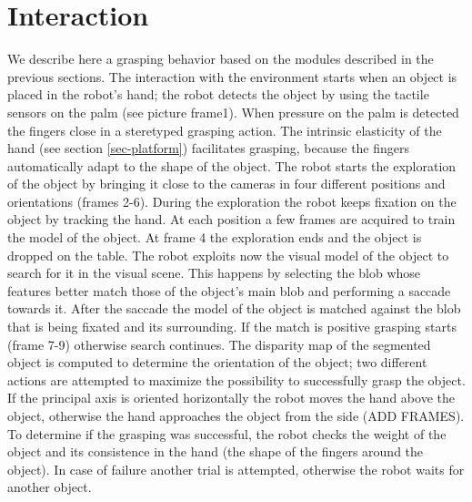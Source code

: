 \section{Interaction}
We describe here a grasping behavior based on the modules described in the previous sections. The interaction with the environment starts when an object is placed in the robot's hand; the robot detects the object by using the tactile sensors on the palm (see picture frame1). When pressure on the palm is detected the fingers close in a steretyped grasping action. The intrinsic elasticity of the hand (see section \ref{sec-platform}) facilitates grasping, because the fingers automatically adapt to the shape of the object. The robot starts the exploration of the object by bringing it close to the cameras in four different positions and orientations (frames 2-6). During the exploration the robot keeps fixation on the object by tracking the hand. At each position a few frames are acquired to train the model of the object. At frame 4 the exploration ends and the object is dropped on the table. The robot exploits now the visual model of the object to search for it in the visual scene. This happens by selecting the blob whose features better match those of the object's main blob and performing a saccade towards it. After the saccade the model of the object is matched against the blob that is being fixated and its surrounding. If the match is positive grasping starts (frame 7-9) otherwise search continues. The disparity map of the segmented object is computed to determine the orientation of the object; two different actions are attempted to maximize the possibility to successfully grasp the object. If the principal axis is oriented horizontally the robot moves the hand above the object, otherwise the hand approaches the object from the side (ADD FRAMES). To determine if the grasping was successful, the robot checks the weight of the object and its consistence in the hand (the shape of the fingers around the object). In case of failure another trial is attempted, otherwise the robot waits for another object.